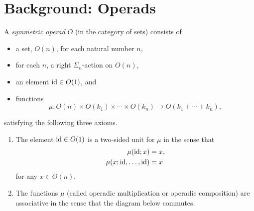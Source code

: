 

\section{Background: Operads}

\begin{Defi}
A \textit{symmetric operad} $O$ (in the category of sets) consists of
\begin{itemize}
\item a set, $O(n)$, for each natural number $n$,
\item for each $n$, a right $\Sigma_{n}$-action on $O(n)$,
\item an element $\textrm{id} \in O(1)$, and
\item functions
  \[
    \mu \colon  O(n) \times O(k_{1}) \times \cdots \times O(k_{n}) \rightarrow O(k_{1} + \cdots + k_{n}),
  \]
\end{itemize}
satisfying the following three axioms.
\begin{enumerate}
\item The element $\textrm{id} \in O(1)$ is a two-sided unit for $\mu$ in the sense that
  \begin{align*}
    \mu(\textrm{id};x) &= x,\\
    \mu(x;\textrm{id},\ldots,\textrm{id}) &= x
  \end{align*}
for any $x \in O(n)$.
\item The functions $\mu$ (called operadic multiplication or operadic composition) are associative in the sense that the diagram below commutes.



\end{enumerate}
\end{Defi}
